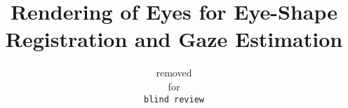 \documentclass[10pt,twocolumn,letterpaper]{article}
\newcommand{\commentA}[1]{\textsf{\textbf{\textcolor{orange}{Andreas: #1}}}}
\begin{document}
\title{Rendering of Eyes for Eye-Shape Registration and Gaze Estimation}



\author{removed\\
for\\
{\tt\small blind review}
}

\maketitle

\begin{abstract}

\end{abstract}


%









{\small


}
\end{document}
